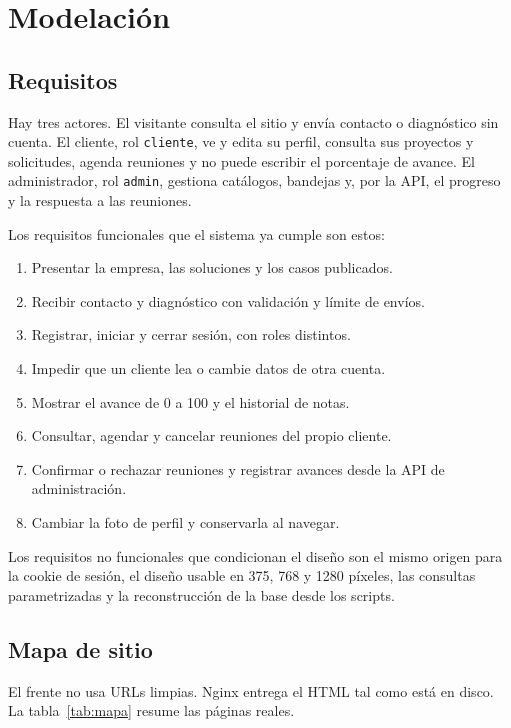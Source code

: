 \section{Modelación}

\subsection{Requisitos}

Hay tres actores. El visitante consulta el sitio y envía contacto o
diagnóstico sin cuenta. El cliente, rol \texttt{cliente}, ve y edita su
perfil, consulta sus proyectos y solicitudes, agenda reuniones y no puede
escribir el porcentaje de avance. El administrador, rol \texttt{admin},
gestiona catálogos, bandejas y, por la API, el progreso y la respuesta a las
reuniones.

Los requisitos funcionales que el sistema ya cumple son estos:

\begin{enumerate}
  \item Presentar la empresa, las soluciones y los casos publicados.
  \item Recibir contacto y diagnóstico con validación y límite de envíos.
  \item Registrar, iniciar y cerrar sesión, con roles distintos.
  \item Impedir que un cliente lea o cambie datos de otra cuenta.
  \item Mostrar el avance de 0 a 100 y el historial de notas.
  \item Consultar, agendar y cancelar reuniones del propio cliente.
  \item Confirmar o rechazar reuniones y registrar avances desde la API de administración.
  \item Cambiar la foto de perfil y conservarla al navegar.
\end{enumerate}

Los requisitos no funcionales que condicionan el diseño son el mismo origen
para la cookie de sesión, el diseño usable en 375, 768 y 1280 píxeles, las
consultas parametrizadas y la reconstrucción de la base desde los scripts.

\subsection{Mapa de sitio}

El frente no usa URLs limpias. Nginx entrega el HTML tal como está en disco.
La tabla~\ref{tab:mapa} resume las páginas reales.

